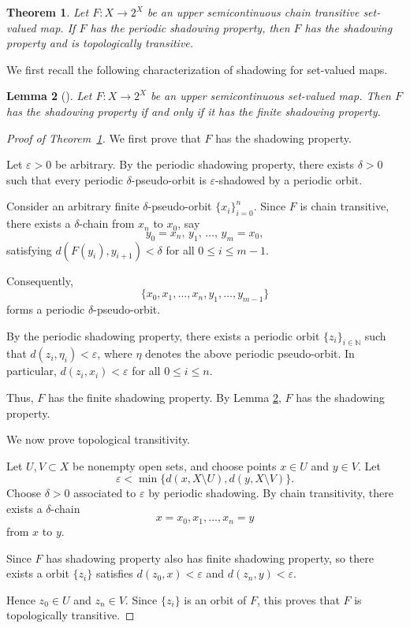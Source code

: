 \documentclass{amsart}
\newtheorem{theorem}{Theorem}[section]
\newtheorem{lemma}[theorem]{Lemma}
\theoremstyle{definition}
\begin{document}
\begin{theorem}
\label{theoremB}
Let $F:X\to 2^X$ be an upper semicontinuous chain transitive set-valued map. If $F$ has the periodic shadowing property, then $F$ has the shadowing property and is topologically transitive.
\end{theorem}

We first recall the following characterization of shadowing for set-valued maps.

\begin{lemma}[\cite{Zhengyu}]
\label{lemma:FSP}
Let $F:X\to 2^X$ be an upper semicontinuous set-valued map. Then $F$ has the shadowing property if and only if it has the finite shadowing property.
\end{lemma}

\begin{proof}[Proof of Theorem~\ref{theoremB}]
We first prove that $F$ has the shadowing property.

Let $\varepsilon>0$ be arbitrary. By the periodic shadowing property, there exists $\delta>0$ such that every periodic $\delta$-pseudo-orbit is $\varepsilon$-shadowed by a periodic orbit.

Consider an arbitrary finite $\delta$-pseudo-orbit $\{x_i\}_{i=0}^{n}$.
Since $F$ is chain transitive, there exists a $\delta$-chain from $x_n$ to $x_0$, say 
\[
y_0=x_n,\, y_1,\, \ldots,\, y_m=x_0,
\]
satisfying $d(F(y_i),y_{i+1})<\delta$ for all $0\leq i\leq m-1$.

Consequently,
\[
\{x_0,x_1,\ldots,x_n,y_1,\ldots,y_{m-1}\}
\]
forms a periodic $\delta$-pseudo-orbit.

By the periodic shadowing property, there exists a periodic orbit $\{z_i\}_{i\in\mathbb N}$ such that $d(z_i,\eta_i)<\varepsilon$, where $\eta$ denotes the above periodic pseudo-orbit. In particular, $d(z_i,x_i)<\varepsilon$
for all $0\leq i\leq n$.

Thus, $F$ has the finite shadowing property. By Lemma \ref{lemma:FSP}, $F$ has the shadowing property.

We now prove topological transitivity.

Let $U,V\subset X$ be nonempty open sets, and choose points $x\in U$ and $y\in V$. Let
\[
\varepsilon
<
\min\{
d(x,X\setminus U),
d(y,X\setminus V)
\}.
\]
Choose $\delta>0$ associated to $\varepsilon$ by periodic shadowing. By chain transitivity, there exists a $\delta$-chain
\[
x=x_0,x_1,\ldots,x_n=y
\]
from $x$ to $y$.

Since $F$ has shadowing property also has finite shadowing property, so  there exists a orbit $\{z_i\}$ satisfies $d(z_0,x)<\varepsilon$ and $d(z_n,y)<\varepsilon$. 

Hence $z_0\in U$ and $z_n\in V$. Since $\{z_i\}$ is an orbit of $F$, this proves that $F$ is topologically transitive.
\end{proof}
\end{document}
